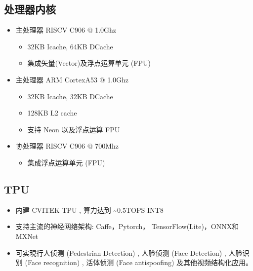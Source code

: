 \documentclass[letterpaper,10pt,english]{sphinxmanual}
\begin{document}
\subsection{处理器内核}
\label{\detokenize{contents/system-overview/features:id2}}\begin{itemize}
\item {} 
\sphinxAtStartPar
主处理器 RISCV C906 @ 1.0Ghz
\begin{itemize}
\item {} 
\sphinxAtStartPar
32KB I\sphinxhyphen{}cache, 64KB D\sphinxhyphen{}Cache

\item {} 
\sphinxAtStartPar
集成矢量(Vector)及浮点运算单元 (FPU)

\end{itemize}

\item {} 
\sphinxAtStartPar
主处理器 ARM Cortex\sphinxhyphen{}A53 @ 1.0Ghz
\begin{itemize}
\item {} 
\sphinxAtStartPar
32KB I\sphinxhyphen{}cache, 32KB D\sphinxhyphen{}Cache

\item {} 
\sphinxAtStartPar
128KB L2 cache

\item {} 
\sphinxAtStartPar
支持 Neon 以及浮点运算 FPU

\end{itemize}

\item {} 
\sphinxAtStartPar
协处理器 RISCV C906 @ 700Mhz
\begin{itemize}
\item {} 
\sphinxAtStartPar
集成浮点运算单元 (FPU)

\end{itemize}

\end{itemize}


\subsection{TPU}
\label{\detokenize{contents/system-overview/features:tpu}}\begin{itemize}
\item {} 
\sphinxAtStartPar
内建 CVITEK TPU , 算力达到 \textasciitilde{}0.5TOPS INT8

\item {} 
\sphinxAtStartPar
支持主流的神经网络架构: Caffe，Pytorch，
TensorFlow(Lite)，ONNX和MXNet

\item {} 
\sphinxAtStartPar
可实現行人侦测 (Pedestrian Detection) , 人脸侦测 (Face Detection) ,
人脸识别 (Face recognition) , 活体侦测 (Face anti\sphinxhyphen{}spoofing)
及其他视频结构化应用。

\end{itemize}
\end{document}
